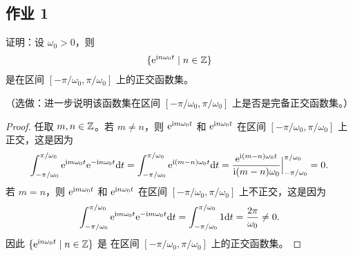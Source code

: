 \subsection{作业 1}

\begin{homework}
    证明：设 $\omega_0 > 0$，则
    \begin{align*}
        \{\mathrm{e}^{\mathrm{i} n\omega_0t} \mid n \in \mathbb{Z}\}
    \end{align*}
    是在区间 $[-\pi/\omega_0, \pi/\omega_0]$ 上的正交函数集。

    （选做：进一步说明该函数集在区间 $[-\pi/\omega_0, \pi/\omega_0]$ 上是否是完备正交函数集。）
\end{homework}

\begin{proof}
    任取 $m, n \in \mathbb{Z}$。若 $m \neq n$，则 $\mathrm{e}^{\mathrm{i} m\omega_0t}$ 和 $\mathrm{e}^{\mathrm{i} n\omega_0t}$
    在区间 $[-\pi/\omega_0, \pi/\omega_0]$ 上正交，这是因为
    \begin{align*}
        \int_{-\pi/\omega_0}^{\pi/\omega_0}\mathrm{e}^{\mathrm{i} m\omega_0t}\mathrm{e}^{-\mathrm{i} n\omega_0t}\mathrm{d}t
        = \int_{-\pi/\omega_0}^{\pi/\omega_0}\mathrm{e}^{\mathrm{i} (m - n)\omega_0t}\mathrm{d}t
        = \frac{\mathrm{e}^{\mathrm{i} (m - n)\omega_0t}}{\mathrm{i} (m - n)\omega_0}\Big|_{-\pi/\omega_0}^{\pi/\omega_0}
        = 0.
    \end{align*}
    若 $m = n$，则 $\mathrm{e}^{\mathrm{i} m\omega_0t}$ 和 $\mathrm{e}^{\mathrm{i} n\omega_0t}$
    在区间 $[-\pi/\omega_0, \pi/\omega_0]$ 上不正交，这是因为
    \begin{align*}
        \int_{-\pi/\omega_0}^{\pi/\omega_0}\mathrm{e}^{\mathrm{i} m\omega_0t}\mathrm{e}^{-\mathrm{i} m\omega_0t}\mathrm{d}t
        = \int_{-\pi/\omega_0}^{\pi/\omega_0}1\mathrm{d}t
        = \frac{2\pi}{\omega_0} \neq 0.
    \end{align*}
    因此 $\{\mathrm{e}^{\mathrm{i} n\omega_0t} \mid n \in \mathbb{Z}\}$ 是
    在区间 $[-\pi/\omega_0, \pi/\omega_0]$ 上的正交函数集。
\end{proof}
